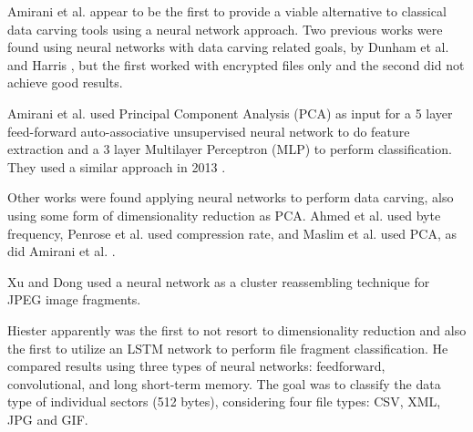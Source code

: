 
Amirani et al.  \cite{amirani_new_2008} appear to be the first 
to provide a viable alternative to classical data carving tools using a neural network approach. Two previous works were found using neural networks with data carving related goals, by Dunham et al. \cite{dunham_classifying_2005} and Harris \cite{harris_using_2007}, but the first worked with encrypted files only and the second did not achieve good results.

Amirani et al.  \cite{amirani_new_2008} used Principal Component Analysis (PCA) as input for a 5 layer feed-forward auto-associative unsupervised neural network to do feature extraction and a 3 layer Multilayer Perceptron (MLP) to perform classification. They used a similar approach in 2013 \cite{amirani_feature-based_2013}.

Other works were found applying neural networks to perform data carving, also using some form of dimensionality reduction as PCA. Ahmed et al. \cite{ahmed_content-based_2010}\cite{ahmed_fast_2011} used byte frequency, 
Penrose et al. \cite{penrose_approaches_2013} used compression rate,
and Maslim et al. \cite{maslim_distributed_2014} used PCA, as did Amirani et al.  \cite{amirani_new_2008}.

Xu and Dong \cite{xu_reassembling_2009} used a neural network as a cluster reassembling technique for JPEG image fragments.

Hiester \cite{hiester_file_2018} apparently was the first to not resort to dimensionality reduction and also the first to utilize an LSTM network to perform file fragment classification. He compared results using three types of neural networks: feedforward, convolutional, and long short-term memory. The goal was to classify the data type of individual sectors (512 bytes), considering four file types: CSV, XML, JPG and GIF.

% 